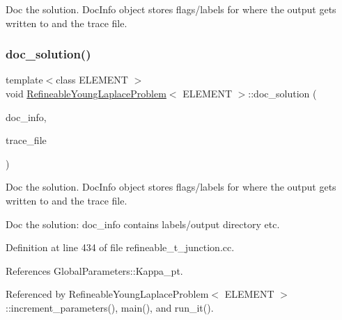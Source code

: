 Doc the solution. Doc\+Info object stores flags/labels for where the output gets written to and the trace file. 

\mbox{\label{classRefineableYoungLaplaceProblem_a4ec7313c8e4015b0c2af0bbef789e70f}} 
\subsubsection{\texorpdfstring{doc\+\_\+solution()}{doc\_solution()}\hspace{0.1cm}{\footnotesize\ttfamily [3/3]}}
{\footnotesize\ttfamily template$<$class E\+L\+E\+M\+E\+NT $>$ \\
void \hyperlink{classRefineableYoungLaplaceProblem}{Refineable\+Young\+Laplace\+Problem}$<$ E\+L\+E\+M\+E\+NT $>$\+::doc\+\_\+solution (\begin{DoxyParamCaption}\item[{Doc\+Info \&}]{doc\+\_\+info,  }\item[{ofstream \&}]{trace\+\_\+file }\end{DoxyParamCaption})}



Doc the solution. Doc\+Info object stores flags/labels for where the output gets written to and the trace file. 

Doc the solution\+: doc\+\_\+info contains labels/output directory etc. 

Definition at line 434 of file refineable\+\_\+t\+\_\+junction.\+cc.



References Global\+Parameters\+::\+Kappa\+\_\+pt.



Referenced by Refineable\+Young\+Laplace\+Problem$<$ E\+L\+E\+M\+E\+N\+T $>$\+::increment\+\_\+parameters(), main(), and run\+\_\+it().

\mbox{\label{classRefineableYoungLaplaceProblem_ac8da9e38012994438200b53d398ce465}} 
